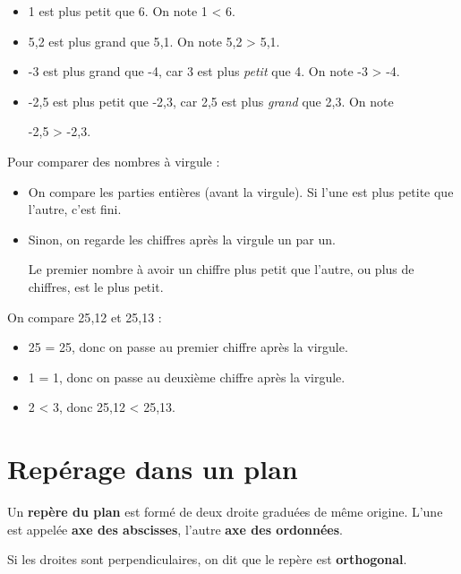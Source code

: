 \documentclass[../€Cours-complet/Cours-complet]{subfiles}
\begin{document}
\begin{exemple}
	\begin{itemize}
		\item 1 est plus petit que 6. On note 1 < 6.
		\item 5{,}2 est plus grand que 5{,}1. On note 5{,}2 > 5{,}1.
		\item -3 est plus grand que -4, car 3 est plus \textit{petit} que 4. On note -3 > -4.
		\item -2{,}5 est plus petit que -2{,}3, car 2{,}5 est plus \textit{grand} que 2{,}3. On note

		      -2{,}5 > -2{,}3.
	\end{itemize}
\end{exemple}

\begin{greybox}[frametitle={Rappel : comparer des nombres à virgules}]
	Pour comparer des nombres à virgule :
	\begin{itemize}
		\item On compare les parties entières (avant la virgule). Si l'une est plus petite que l'autre, c'est fini.
		\item Sinon, on regarde les chiffres après la virgule un par un.

		      Le premier nombre à avoir un chiffre plus petit que l'autre, ou plus de chiffres, est le plus petit.
	\end{itemize}

	\begin{exemple}
		On compare 25{,}12 et 25{,}13 :

		\begin{itemize}
			\item 25 = 25, donc on passe au premier chiffre après la virgule.
			\item 1 = 1, donc on passe au deuxième chiffre après la virgule.
			\item 2 < 3, donc 25{,}12 < 25{,}13.
		\end{itemize}
	\end{exemple}
\end{greybox}

\section{Repérage dans un plan}

\begin{cours}
	Un \textbf{repère du plan} est formé de deux droite graduées de même origine. L'une est appelée \textbf{\color{red} axe des abscisses}, l'autre \textbf{\color{blue} axe des ordonnées}.

	Si les droites sont perpendiculaires, on dit que le repère est \textbf{orthogonal}.
\end{cours}
\end{document}
